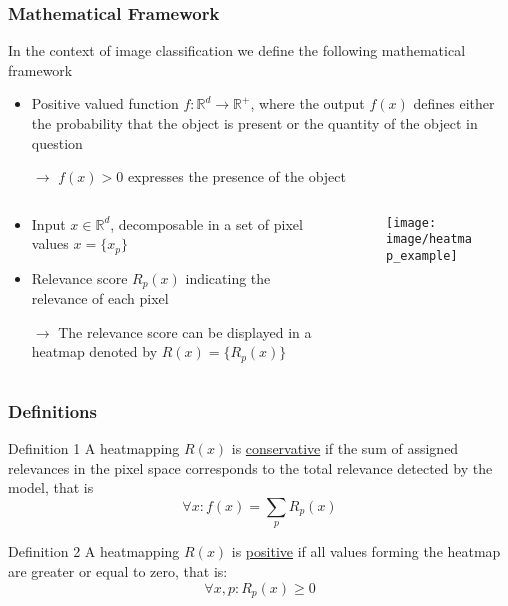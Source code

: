 \documentclass{beamer}
\begin{document}
\begin{frame}
\frametitle{Mathematical Framework}

In the context of image classification we define the following mathematical framework
\begin{itemize}
\item Positive valued function $f:\mathbb{R}^d\to \mathbb{R}^+$, where the output $f(x)$ defines either the probability that the object is present or the quantity of the object in question
\item[$\rightarrow$] $f(x)>0$ expresses the presence of the object  

\pause
\end{itemize}

 \begin{columns}
          \begin{column}[T]{8cm}
          		\begin{itemize}
          		\item Input $x \in \mathbb{R}^d$, decomposable in a set of pixel values $x=\{x_p\}$
			\item Relevance score $R_p(x)$ indicating the relevance of each pixel
			\item[$\rightarrow$] The relevance score can be displayed in a heatmap denoted by $R(x) = \{R_p(x)\}$
			\end{itemize}

            \end{column} 
            \begin{column}[T]{3.5cm}
			\begin{figure}
			\texttt{[image: image/heatmap\_example]}
			\end{figure}
	\end{column}
\end{columns} 

\end{frame}



\begin{frame}
\frametitle{Definitions}
\begin{block}{Definition 1}
A heatmapping $R(x)$ is \underline{conservative} if the sum of assigned relevances in the pixel space corresponds to the total relevance detected by the model, that is
\begin{equation}
\forall x: f(x)=\sum_p R_p(x)
\end{equation}
\end{block}

\vspace{0.5cm}
\pause
\begin{block}{Definition 2}
A heatmapping $R(x)$ is  \underline{positive} if all values forming the heatmap are greater or equal to zero, that is:
\begin{equation}
\forall x,p: R_p(x) \geq 0
\end{equation}
\end{block}

\end{frame}
\end{document}
